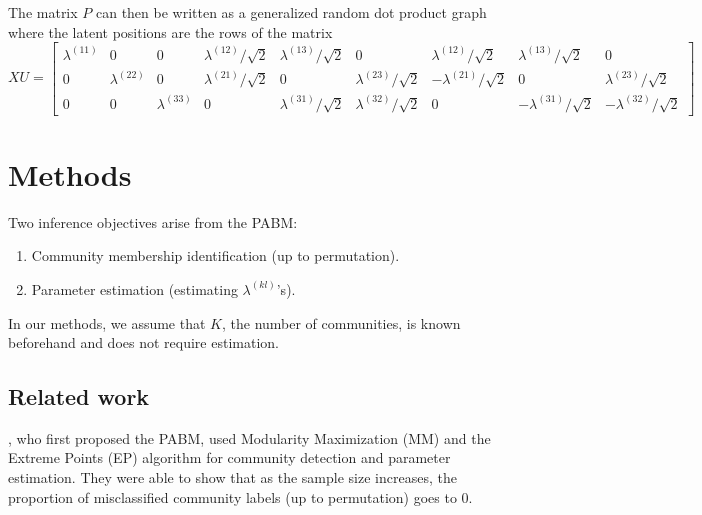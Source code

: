 \documentclass[12pt]{article}
\providecommand{\tightlist}{%
  \setlength{\itemsep}{0pt}\setlength{\parskip}{0pt}}
\begin{document}
\begin{example}[$K = 3$]
The matrix $P$ can then be written as a generalized random dot product
graph where the latent positions are the rows of the matrix
$$XU = \begin{bmatrix}
  \lambda^{(11)} & 0 & 0 &
  \lambda^{(12)} / \sqrt{2} & \lambda^{(13)} / \sqrt{2} & 0 &
  \lambda^{(12)} / \sqrt{2} & \lambda^{(13)} / \sqrt{2} & 0 \\
  0 & \lambda^{(22)} & 0 &
  \lambda^{(21)} / \sqrt{2} & 0 & \lambda^{(23)} / \sqrt{2} &
  -\lambda^{(21)} / \sqrt{2} & 0 & \lambda^{(23)} / \sqrt{2} \\
  0 & 0 & \lambda^{(33)} &
  0 & \lambda^{(31)} / \sqrt{2} & \lambda^{(32)} / \sqrt{2} &
  0 & -\lambda^{(31)} / \sqrt{2} & -\lambda^{(32)} / \sqrt{2}
\end{bmatrix}$$
\end{example}

\hypertarget{methods}{%
\section{Methods}\label{methods}}

Two inference objectives arise from the PABM:

\begin{enumerate}
\def\labelenumi{\arabic{enumi}.}
\tightlist
\item
  Community membership identification (up to permutation).
\item
  Parameter estimation (estimating \(\lambda^{(kl)}\)'s).
\end{enumerate}

In our methods, we assume that \(K\), the number of communities, is
known beforehand and does not require estimation.

\hypertarget{related-work}{%
\subsection{Related work}\label{related-work}}

\citeauthor{307cbeb9b1be48299388437423d94bf1}, who first proposed the
PABM, used Modularity Maximization (MM) and the Extreme Points (EP)
algorithm \cite{le2016} for community detection and parameter
estimation. They were able to show that as the sample size increases,
the proportion of misclassified community labels (up to permutation)
goes to 0.
\end{document}
